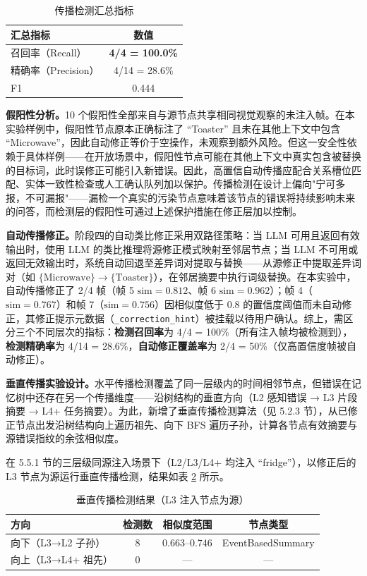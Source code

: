 \begin{table}[htbp]
\centering
\caption{传播检测汇总指标}
\label{tab:5-2b}
\begin{tabular}{lc}
\toprule
汇总指标 & 数值 \\
\midrule
召回率（Recall） & \textbf{4/4 = 100.0\%} \\
精确率（Precision） & 4/14 = 28.6\% \\
F1 & 0.444 \\
\bottomrule
\end{tabular}
\end{table}

\textbf{假阳性分析。}10 个假阳性全部来自与源节点共享相同视觉观察的未注入帧。在本实验样例中，假阳性节点原本正确标注了 “Toaster” 且未在其他上下文中包含 “Microwave”，因此自动修正等价于空操作，未观察到额外风险。但这一安全性依赖于具体样例——在开放场景中，假阳性节点可能在其他上下文中真实包含被替换的目标词，此时误修正可能引入新错误。因此，高置信自动传播应配合关系槽位匹配、实体一致性检查或人工确认队列加以保护。传播检测在设计上偏向"宁可多报，不可漏报"——漏检一个真实的污染节点意味着该节点的错误将持续影响未来的问答，而检测层的假阳性可通过上述保护措施在修正层加以控制。

\textbf{自动传播修正。}阶段四的自动类比修正采用双路径策略：当 LLM 可用且返回有效输出时，使用 LLM 的类比推理将源修正模式映射至邻居节点；当 LLM 不可用或返回无效输出时，系统自动回退至差异词对提取与替换——从源修正中提取差异词对（如 $\{\mathrm{Microwave}\} \rightarrow \{\mathrm{Toaster}\}$），在邻居摘要中执行词级替换。在本实验中，自动传播修正了 2/4 帧（帧 5 $\mathrm{sim}=0.812$、帧 6 $\mathrm{sim}=0.962$）；帧 4（$\mathrm{sim}=0.767$）和帧 7（$\mathrm{sim}=0.756$）因相似度低于 0.8 的置信度阈值而未自动修正，其修正提示元数据（\texttt{\_correction\_hint}）被挂载以待用户确认。综上，需区分三个不同层次的指标：\textbf{检测召回率}为 4/4 = 100\%（所有注入帧均被检测到），\textbf{检测精确率}为 4/14 = 28.6\%，\textbf{自动修正覆盖率}为 2/4 = 50\%（仅高置信度帧被自动修正）。

\textbf{垂直传播实验设计。}水平传播检测覆盖了同一层级内的时间相邻节点，但错误在记忆树中还存在另一个传播维度——沿树结构的垂直方向（L2 感知错误 → L3 片段摘要 → L4+ 任务摘要）。为此，新增了垂直传播检测算法（见 5.2.3 节），从已修正节点出发沿树结构向上遍历祖先、向下 BFS 遍历子孙，计算各节点有效摘要与源错误指纹的余弦相似度。

在 5.5.1 节的三层级同源注入场景下（L2/L3/L4+ 均注入 “fridge”），以修正后的 L3 节点为源运行垂直传播检测，结果如表 \ref{tab:5-3} 所示。

\begin{table}[htbp]
\centering
\caption{垂直传播检测结果（L3 注入节点为源）}
\label{tab:5-3}
\begin{tabular}{lccc}
\toprule
方向 & 检测数 & 相似度范围 & 节点类型 \\
\midrule
向下（L3→L2 子孙） & 8 & 0.663–0.746 & EventBasedSummary \\
向上（L3→L4+ 祖先） & 0 & — & — \\
\bottomrule
\end{tabular}
\end{table}

